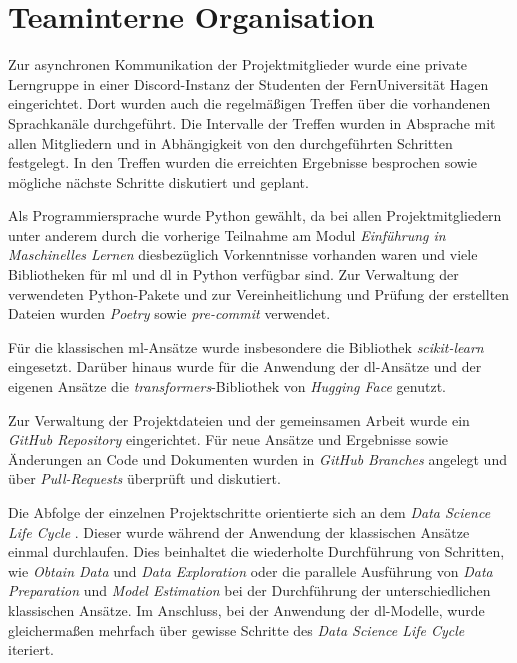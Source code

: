 \section{Teaminterne Organisation}\label{sec:teaminterneorganisation}

Zur asynchronen Kommunikation der Projektmitglieder wurde eine private Lerngruppe in einer Discord-Instanz der Studenten der FernUniversität Hagen eingerichtet.
Dort wurden auch die regelmäßigen Treffen über die vorhandenen Sprachkanäle durchgeführt.
Die Intervalle der Treffen wurden in Absprache mit allen Mitgliedern und in Abhängigkeit von den durchgeführten Schritten festgelegt.
In den Treffen wurden die erreichten Ergebnisse besprochen sowie mögliche nächste Schritte diskutiert und geplant.

Als Programmiersprache wurde Python gewählt, da bei allen Projektmitgliedern unter anderem durch die vorherige Teilnahme am Modul \textit{Einführung in Maschinelles Lernen} diesbezüglich Vorkenntnisse vorhanden waren und viele Bibliotheken für \gls{ml} und \gls{dl} in Python verfügbar sind.
Zur Verwaltung der verwendeten Python-Pakete und zur Vereinheitlichung und Prüfung der erstellten Dateien wurden \textit{Poetry} \cite{poetry2025} sowie \textit{pre-commit} \cite{precommit2025} verwendet.

Für die klassischen \gls{ml}-Ansätze wurde insbesondere die Bibliothek \textit{scikit-learn} eingesetzt.
Darüber hinaus wurde für die Anwendung der \gls{dl}-Ansätze und der eigenen Ansätze die \textit{transformers}-Bibliothek von \textit{Hugging Face} genutzt.

Zur Verwaltung der Projektdateien und der gemeinsamen Arbeit wurde ein \textit{GitHub Repository} \cite{githubrepo2025} eingerichtet.
Für neue Ansätze und Ergebnisse sowie Änderungen an Code und Dokumenten wurden in \textit{GitHub} \textit{Branches} angelegt und über \textit{Pull-Requests} überprüft und diskutiert.

Die Abfolge der einzelnen Projektschritte orientierte sich an dem \textit{Data Science Life Cycle} \cite[Abb. 2]{Stodden2020}.
Dieser wurde während der Anwendung der klassischen Ansätze einmal durchlaufen.
Dies beinhaltet die wiederholte Durchführung von Schritten, wie \textit{Obtain Data} und \textit{Data Exploration} oder die parallele Ausführung von \textit{Data Preparation} und \textit{Model Estimation} bei der Durchführung der unterschiedlichen klassischen Ansätze.
Im Anschluss, bei der Anwendung der \gls{dl}-Modelle, wurde gleichermaßen mehrfach über gewisse Schritte des \textit{Data Science Life Cycle} iteriert.
